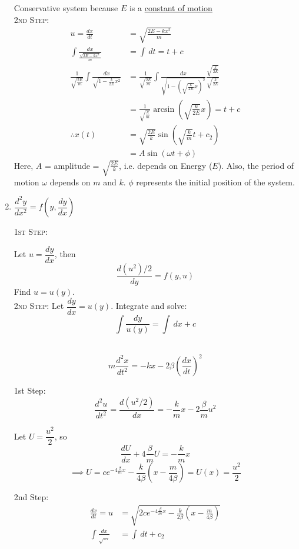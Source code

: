 \documentclass[10pt]{scrartcl}
\begin{document}
\begin{enumerate}[(1)]
\begin{example}
Conservative system because $E$ is a \href{https://en.wikipedia.org/wiki/Constant_of_motion}{constant of motion}\\
\textsc{2nd Step:}
\[
\begin{aligned}
  u = \frac{dx}{dt} &= \sqrt{\frac{2E -kx^2}{m}}\\
  \int \frac{dx}{\frac{\sqrt{2E-kx^2}}{m}} &= \int \,dt = t +c\\
  \frac{1}{\sqrt{\frac{2E}{m}}}\int \frac{dx}{\sqrt{1-\frac{k}{2E}x^2}} &=  \frac{1}{\sqrt{\frac{2E}{m}}} \int \frac{dx}{\sqrt{1-\left(\sqrt{\frac{k}{2E}}x\right)^2}}\frac{\sqrt{\frac{k}{2E}}}{\sqrt{\frac{k}{2E}}}\\
  &= \frac{1}{\sqrt{\frac{k}{m}}}\arcsin\left(\sqrt{\frac{k}{2E}}x\right) = t+c\\
  \therefore x(t) &= \sqrt{\frac{2E}{k}}\sin\left(\sqrt{\frac{k}{m}}t + c_2\right)\\
  &= A\sin(\omega t + \phi)
\end{aligned}
\]
Here, $A$ = amplitude = $\sqrt{\frac{2E}{k}}$, i.e. depends on Energy ($E$). Also, the period of motion $\omega$ depends on $m$ and $k$. $\phi$ represents the initial position of the system.
\end{example}

\item $\dfrac{d^2y}{dx^2} = f\left(y,\dfrac{dy}{dx}\right)$

\textsc{1st Step:}

Let $u = \dfrac{dy}{dx}$, then 
\[\frac{d(u^2)/2}{dy} = f(y,u)\]
Find $u = u(y)$.\\

\textsc{2nd Step:}
Let $\dfrac{dy}{dx} = u(y)$. Integrate and solve:
\[\int \frac{dy}{u(y)} = \int\,dx + c\]~

\begin{example}[Spring]
	\[m\frac{d^2x}{dt^2} = -kx - 2\beta\left(\frac{dx}{dt}\right)^2\]
	
	1st Step: 
	\[\frac{d^2u}{dt^2} = \frac{d(u^2/2)}{dx} = -\frac{k}{m}x - 2\frac{\beta}{m}u^2\]
	
	Let $U = \dfrac{u^2}{2}$, so 
	\[\frac{dU}{dx} + 4\frac{\beta}{m}U = -\frac{k}{m}x\]
	\[\implies U = ce^{-4\frac{\beta}{m}x} - \frac{k}{4\beta}\left(x - \frac{m}{4\beta}\right) = U(x) = \frac{u^2}{2}\]

	2nd Step: 
	\[
\begin{aligned}
  \frac{dx}{dt} = u &= \sqrt{2ce^{-4\frac{\beta}{m}x} - \frac{k}{2\beta}\left(x-\frac{m}{4\beta}\right)}\\
  \int \frac{dx}{\sqrt{\dots}} &= \int \,dt + c_2
\end{aligned}
\]
\end{example}
\end{enumerate}
\end{document}
